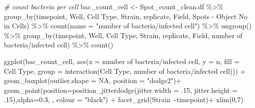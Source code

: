 \documentclass[
]{article}
\newenvironment{Shaded}{\begin{snugshade}}{\end{snugshade}}
\newcommand{\AttributeTok}[1]{\textcolor[rgb]{0.77,0.63,0.00}{#1}}
\newcommand{\CommentTok}[1]{\textcolor[rgb]{0.56,0.35,0.01}{\textit{#1}}}
\newcommand{\ConstantTok}[1]{\textcolor[rgb]{0.00,0.00,0.00}{#1}}
\newcommand{\DecValTok}[1]{\textcolor[rgb]{0.00,0.00,0.81}{#1}}
\newcommand{\FloatTok}[1]{\textcolor[rgb]{0.00,0.00,0.81}{#1}}
\newcommand{\FunctionTok}[1]{\textcolor[rgb]{0.00,0.00,0.00}{#1}}
\newcommand{\NormalTok}[1]{#1}
\newcommand{\OtherTok}[1]{\textcolor[rgb]{0.56,0.35,0.01}{#1}}
\newcommand{\SpecialCharTok}[1]{\textcolor[rgb]{0.00,0.00,0.00}{#1}}
\newcommand{\StringTok}[1]{\textcolor[rgb]{0.31,0.60,0.02}{#1}}
\begin{document}
\begin{Shaded}
\begin{Highlighting}[]
\CommentTok{\# count bacteria per cell}
\NormalTok{bac\_count\_cell }\OtherTok{\textless{}{-}}\NormalTok{ Spot\_count\_clean.df  }\SpecialCharTok{\%\textgreater{}\%} 
  \FunctionTok{group\_by}\NormalTok{(timepoint,  Well, }\StringTok{\textasciigrave{}}\AttributeTok{Cell Type}\StringTok{\textasciigrave{}}\NormalTok{, Strain, replicate, Field, }\StringTok{\textasciigrave{}}\AttributeTok{Spots {-} Object No in Cells}\StringTok{\textasciigrave{}}\NormalTok{) }\SpecialCharTok{\%\textgreater{}\%}
  \FunctionTok{count}\NormalTok{(}\AttributeTok{name =} \StringTok{"number of bacteria/infected cell"}\NormalTok{) }\SpecialCharTok{\%\textgreater{}\%}
  \FunctionTok{ungroup}\NormalTok{() }\SpecialCharTok{\%\textgreater{}\%}
  \FunctionTok{group\_by}\NormalTok{(timepoint,  Well, }\StringTok{\textasciigrave{}}\AttributeTok{Cell Type}\StringTok{\textasciigrave{}}\NormalTok{, Strain, replicate, Field, }\StringTok{\textasciigrave{}}\AttributeTok{number of bacteria/infected cell}\StringTok{\textasciigrave{}}\NormalTok{) }\SpecialCharTok{\%\textgreater{}\%}
  \FunctionTok{count}\NormalTok{()}


\FunctionTok{ggplot}\NormalTok{(bac\_count\_cell, }\FunctionTok{aes}\NormalTok{(}\AttributeTok{x =} \StringTok{\textasciigrave{}}\AttributeTok{number of bacteria/infected cell}\StringTok{\textasciigrave{}}\NormalTok{, }\AttributeTok{y =}\NormalTok{ n, }\AttributeTok{fill =} \StringTok{\textasciigrave{}}\AttributeTok{Cell Type}\StringTok{\textasciigrave{}}\NormalTok{,}
                           \AttributeTok{group =}  \FunctionTok{interaction}\NormalTok{(}\StringTok{\textasciigrave{}}\AttributeTok{Cell Type}\StringTok{\textasciigrave{}}\NormalTok{, }\StringTok{\textasciigrave{}}\AttributeTok{number of bacteria/infected cell}\StringTok{\textasciigrave{}}\NormalTok{))) }\SpecialCharTok{+}
  \FunctionTok{geom\_boxplot}\NormalTok{(}\AttributeTok{outlier.shape =} \ConstantTok{NA}\NormalTok{, }\AttributeTok{position =} \StringTok{"dodge2"}\NormalTok{)}\SpecialCharTok{+}
  \FunctionTok{geom\_point}\NormalTok{(}\AttributeTok{position=}\FunctionTok{position\_jitterdodge}\NormalTok{(}\AttributeTok{jitter.width =}\NormalTok{ .}\DecValTok{15}\NormalTok{, }\AttributeTok{jitter.height =}\NormalTok{ .}\DecValTok{15}\NormalTok{),}\AttributeTok{alpha=}\FloatTok{0.3}\NormalTok{, , }\AttributeTok{colour =} \StringTok{"black"}\NormalTok{) }\SpecialCharTok{+}
  \FunctionTok{facet\_grid}\NormalTok{(Strain }\SpecialCharTok{\textasciitilde{}}\NormalTok{timepoint)}\SpecialCharTok{+}
  \FunctionTok{xlim}\NormalTok{(}\DecValTok{0}\NormalTok{,}\DecValTok{7}\NormalTok{)}
\end{Highlighting}
\end{Shaded}
\end{document}

